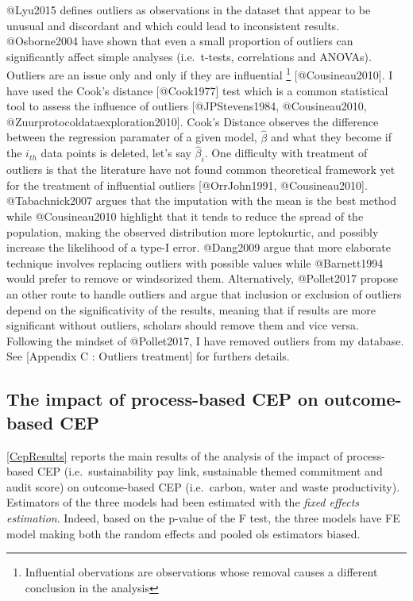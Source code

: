 \documentclass[]{article}
\let\rmarkdownfootnote\footnote%
\def\footnote{\protect\rmarkdownfootnote}
\begin{document}
@Lyu2015 defines outliers as observations in the dataset that appear to
be unusual and discordant and which could lead to inconsistent results.
@Osborne2004 have shown that even a small proportion of outliers can
significantly affect simple analyses (i.e.~t-tests, correlations and
ANOVAs). Outliers are an issue only and only if they are influential
\footnote{Influential obervations are observations whose  removal causes a different conclusion in the analysis}
{[}@Cousineau2010{]}. I have used the Cook's distance {[}@Cook1977{]}
test which is a common statistical tool to assess the influence of
outliers {[}@JPStevens1984, @Cousineau2010,
@Zuurprotocoldataexploration2010{]}. Cook's Distance observes the
difference between the regression paramater of a given model,
\(\hat{\beta}\) and what they become if the \(i_{th}\) data points is
deleted, let's say \(\hat{\beta}_{i}\). One difficulty with treatment of
outliers is that the literature have not found common theoretical
framework yet for the treatment of influential outliers {[}@OrrJohn1991,
@Cousineau2010{]}. @Tabachnick2007 argues that the imputation with the
mean is the best method while @Cousineau2010 highlight that it tends to
reduce the spread of the population, making the observed distribution
more leptokurtic, and possibly increase the likelihood of a type-I
error. @Dang2009 argue that more elaborate technique involves replacing
outliers with possible values while @Barnett1994 would prefer to remove
or windsorized them. Alternatively, @Pollet2017 propose an other route
to handle outliers and argue that inclusion or exclusion of outliers
depend on the significativity of the results, meaning that if results
are more significant without outliers, scholars should remove them and
vice versa. Following the mindset of @Pollet2017, I have removed
outliers from my database. See {[}Appendix C : Outliers treatment{]} for
furthers details.

\subsection{The impact of process-based CEP on outcome-based
CEP}\label{the-impact-of-process-based-cep-on-outcome-based-cep}

\autoref{CepResults} reports the main results of the analysis of the
impact of process-based CEP (i.e.~sustainability pay link, sustainable
themed commitment and audit score) on outcome-based CEP (i.e.~carbon,
water and waste productivity). Estimators of the three models had been
estimated with the \emph{fixed effects estimation}. Indeed, based on the
p-value of the F test, the three models have FE model making both the
random effects and pooled ols estimators biased.
\end{document}

